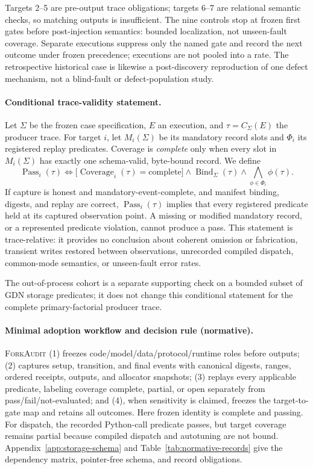 \documentclass{article}
\newcommand{\method}{\textsc{ForkAudit}}
\begin{document}
Targets 2--5 are pre-output trace obligations; targets 6--7 are relational
semantic checks, so matching outputs is insufficient.  The nine controls stop
at frozen first gates before post-injection semantics: bounded localization,
not unseen-fault coverage.  Separate executions suppress only the named gate
and record the next outcome under frozen precedence; executions are not pooled
into a rate.  The retrospective historical case is likewise a post-discovery
reproduction of one defect mechanism, not a blind-fault or defect-population
study.

\paragraph{Conditional trace-validity statement.}
Let $\Sigma$ be the frozen case specification, $E$ an execution, and
$\tau=C_{\Sigma}(E)$ the producer trace.  For target $i$, let
$M_i(\Sigma)$ be its mandatory record slots and $\Phi_i$ its registered replay
predicates.  Coverage is \emph{complete} only when every slot in
$M_i(\Sigma)$ has exactly one schema-valid, byte-bound record.  We define
\begin{equation}
  \operatorname{Pass}_i(\tau) \Longleftrightarrow
  \bigl[\operatorname{Coverage}_i(\tau)=\mathrm{complete}\bigr]
  \wedge \operatorname{Bind}_{\Sigma}(\tau)
  \wedge \bigwedge_{\phi\in\Phi_i}\phi(\tau).
\end{equation}
If capture is honest and mandatory-event-complete, and manifest binding,
digests, and replay are correct, $\operatorname{Pass}_i(\tau)$ implies that
every registered predicate held at its captured observation point.  A missing
or modified mandatory record, or a represented predicate violation, cannot
produce a pass.  This statement is trace-relative: it provides no conclusion
about coherent omission or fabrication, transient writes restored between
observations, unrecorded compiled dispatch, common-mode semantics, or
unseen-fault error rates.

The out-of-process cohort is a separate supporting check on a bounded subset
of GDN storage predicates; it does not change this conditional statement for
the complete primary-factorial producer trace.

\paragraph{Minimal adoption workflow and decision rule (normative).}
\method{} (1) freezes code/model/data/protocol/runtime roles before outputs;
(2) captures setup, transition, and final events with canonical digests,
ranges, ordered receipts, outputs, and allocator snapshots; (3) replays every
applicable predicate, labeling coverage complete, partial, or open separately
from pass/fail/not-evaluated; and (4), when sensitivity is claimed, freezes the
target-to-gate map and retains all outcomes.  Here frozen identity is complete
and passing.  For dispatch, the recorded Python-call predicate passes, but
target coverage remains partial because compiled dispatch and autotuning are
not bound.
Appendix~\ref{app:storage-schema} and Table~\ref{tab:normative-records} give the
dependency matrix, pointer-free schema, and record obligations.
\end{document}
